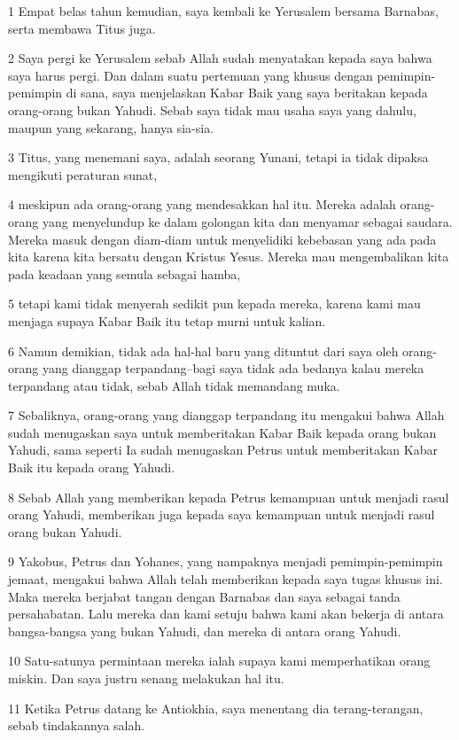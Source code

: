 \par 1 Empat belas tahun kemudian, saya kembali ke Yerusalem bersama Barnabas, serta membawa Titus juga.
\par 2 Saya pergi ke Yerusalem sebab Allah sudah menyatakan kepada saya bahwa saya harus pergi. Dan dalam suatu pertemuan yang khusus dengan pemimpin-pemimpin di sana, saya menjelaskan Kabar Baik yang saya beritakan kepada orang-orang bukan Yahudi. Sebab saya tidak mau usaha saya yang dahulu, maupun yang sekarang, hanya sia-sia.
\par 3 Titus, yang menemani saya, adalah seorang Yunani, tetapi ia tidak dipaksa mengikuti peraturan sunat,
\par 4 meskipun ada orang-orang yang mendesakkan hal itu. Mereka adalah orang-orang yang menyelundup ke dalam golongan kita dan menyamar sebagai saudara. Mereka masuk dengan diam-diam untuk menyelidiki kebebasan yang ada pada kita karena kita bersatu dengan Kristus Yesus. Mereka mau mengembalikan kita pada keadaan yang semula sebagai hamba,
\par 5 tetapi kami tidak menyerah sedikit pun kepada mereka, karena kami mau menjaga supaya Kabar Baik itu tetap murni untuk kalian.
\par 6 Namun demikian, tidak ada hal-hal baru yang dituntut dari saya oleh orang-orang yang dianggap terpandang--bagi saya tidak ada bedanya kalau mereka terpandang atau tidak, sebab Allah tidak memandang muka.
\par 7 Sebaliknya, orang-orang yang dianggap terpandang itu mengakui bahwa Allah sudah menugaskan saya untuk memberitakan Kabar Baik kepada orang bukan Yahudi, sama seperti Ia sudah menugaskan Petrus untuk memberitakan Kabar Baik itu kepada orang Yahudi.
\par 8 Sebab Allah yang memberikan kepada Petrus kemampuan untuk menjadi rasul orang Yahudi, memberikan juga kepada saya kemampuan untuk menjadi rasul orang bukan Yahudi.
\par 9 Yakobus, Petrus dan Yohanes, yang nampaknya menjadi pemimpin-pemimpin jemaat, mengakui bahwa Allah telah memberikan kepada saya tugas khusus ini. Maka mereka berjabat tangan dengan Barnabas dan saya sebagai tanda persahabatan. Lalu mereka dan kami setuju bahwa kami akan bekerja di antara bangsa-bangsa yang bukan Yahudi, dan mereka di antara orang Yahudi.
\par 10 Satu-satunya permintaan mereka ialah supaya kami memperhatikan orang miskin. Dan saya justru senang melakukan hal itu.
\par 11 Ketika Petrus datang ke Antiokhia, saya menentang dia terang-terangan, sebab tindakannya salah.
